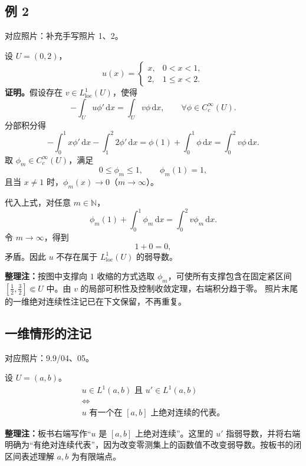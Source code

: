 \documentclass[UTF8,a4paper,11pt,fontset=fandol]{ctexart}
\newcommand{\N}{\mathbb N}
\newcommand{\dd}{\,\mathrm d}
\newcommand{\ednote}[1]{\par{\small\color{notegray}\textbf{整理注：}#1}\par}
\newcommand{\source}[1]{{\small\color{notegray}对应照片：#1。}\par}
\begin{document}
\subsection*{例 2}
\source{补充手写照片 1、2}
设 $U=(0,2)$，
\[
u(x)=\begin{cases}
x,&0<x<1,\\
2,&1\leq x<2.
\end{cases}
\]
\textbf{证明。}假设存在 $v\in L^1_{\mathrm{loc}}(U)$，使得
\[
-\int_Uu\phi'\dd x=\int_Uv\phi\dd x,
\qquad\forall\phi\in C_c^\infty(U).
\]
分部积分得
\[
-\int_0^1x\phi'\dd x-\int_1^2 2\phi'\dd x
=\phi(1)+\int_0^1\phi\dd x
=\int_0^2v\phi\dd x.
\]
取 $\phi_m\in C_c^\infty(U)$，满足
\[
0\leq\phi_m\leq1,\qquad\phi_m(1)=1,
\]
且当 $x\ne1$ 时，$\phi_m(x)\to0$（$m\to\infty$）。
\begin{center}
\end{center}
代入上式，对任意 $m\in\N$，
\[
\phi_m(1)+\int_0^1\phi_m\dd x=\int_0^2v\phi_m\dd x.
\]
令 $m\to\infty$，得到
\[
1+0=0,
\]
矛盾。因此 $u$ 不存在属于 $L^1_{\mathrm{loc}}(U)$ 的弱导数。
\ednote{按图中支撑向 $1$ 收缩的方式选取 $\phi_m$，可使所有支撑包含在固定紧区间
$[\tfrac12,\tfrac32]\Subset U$ 中。由 $v$ 的局部可积性及控制收敛定理，右端积分趋于零。
照片末尾的一维绝对连续性注记已在下文保留，不再重复。}

\newpage
\subsection*{一维情形的注记}
\source{9.9/04、05}
设 $U=(a,b)$。
\[
\begin{gathered}
u\in L^1(a,b)\text{ 且 }u'\in L^1(a,b)\\
\Longleftrightarrow\\
u\text{ 有一个在 }[a,b]\text{ 上绝对连续的代表。}
\end{gathered}
\]
\ednote{板书右端写作“$u$ 是 $[a,b]$ 上绝对连续”。这里的 $u'$ 指弱导数，并将右端明确为“有绝对连续代表”，因为改变零测集上的函数值不改变弱导数。按板书的闭区间表述理解 $a,b$ 为有限端点。}
\end{document}
